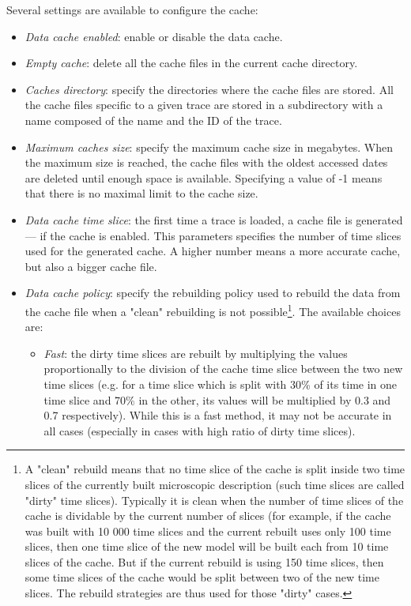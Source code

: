 \documentclass[twoside]{article}
\begin{document}
\begin{sloppypar}
Several settings are available to configure the cache:
\begin{itemize}
	\item \textit{Data cache enabled}: enable or disable the data cache.
	\item \textit{Empty cache}: delete all the cache files in the current cache directory.
	\item \textit{Caches directory}: specify the directories where the cache files are stored. All the cache files specific to a given trace are stored in a subdirectory with a name composed of the name and the ID of the trace.
	\item \textit{Maximum caches size}: specify the maximum cache size in megabytes. When the maximum size is reached, the cache files with the oldest accessed dates are deleted until enough space is available. Specifying a value of -1 means that there is no maximal limit to the cache size.
	\item \textit{Data cache time slice}: the first time a trace is loaded, a cache file is generated --- if the cache is enabled. This parameters specifies the number of time slices used for the generated cache. A higher number means a more accurate cache, but also a bigger cache file.
	\item \textit{Data cache policy}: specify the rebuilding policy used to rebuild the data from the cache file when a "clean" rebuilding is not possible\footnote{A "clean" rebuild means that no time slice of the cache is split inside two time slices of the currently built microscopic description (such time slices are called "dirty" time slices). Typically it is clean when the number of time slices of the cache is dividable by the current number of slices (for example, if the cache was built with 10 000 time slices and the current rebuilt uses only 100 time slices, then one time slice of the new model will be built each from 10 time slices of the cache. But if the current rebuild is using 150 time slices, then some time slices of the cache would be split between two of the new time slices. The rebuild strategies are thus used for those "dirty" cases.}. The available choices are:
	\begin{itemize}
		\item \textit{Fast}: the dirty time slices are rebuilt by multiplying the values proportionally to the division of the cache time slice between the two new time slices (e.g. for a time slice which is split with 30\% of its time in one time slice and 70\% in the other, its values will be multiplied by 0.3 and 0.7 respectively). While this is a fast method, it may not be accurate in all cases (especially in cases with high ratio of dirty time slices).

\end{itemize}
\end{itemize}
\end{sloppypar}
\end{document}
